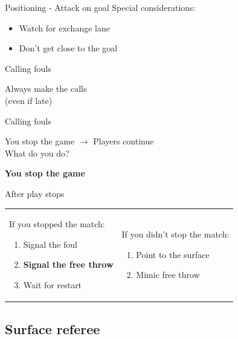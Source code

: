 \documentclass{beamer}
\begin{document}
	\begin{frame}{Positioning - Attack on goal}
		Special considerations:
		\begin{itemize}
			\item Watch for exchange lane
			\item Don't get close to the goal
		\end{itemize}
	\end{frame}

	\begin{frame}{Calling fouls}
		\begin{center}
			Always make the calls \\
			(even if late)
		\end{center}
	\end{frame}

	\begin{frame}{Calling fouls}
		\begin{center}
		You stop the game \pause $\rightarrow$ Players continue \\
		What do you do? \\

		\pause

		\textbf{You stop the game}
		\end{center}
	\end{frame}

	\begin{frame}{After play stops}
		\begin{tabular}{ll}
			\parbox{0.5\linewidth}
			{
				If you stopped the match:
				\begin{enumerate}
					\item Signal the foul
					\item \textbf{Signal the free throw}
					\item Wait for restart
				\end{enumerate}

				\pause
			}
			&
			\parbox{0.5\linewidth}
			{
				If you didn't stop the match:
				\begin{enumerate}
					\item Point to the surface
					\item Mimic free throw
				\end{enumerate}
			}
		\end{tabular}
	\end{frame}

	\subsection{Surface referee}
\end{document}
